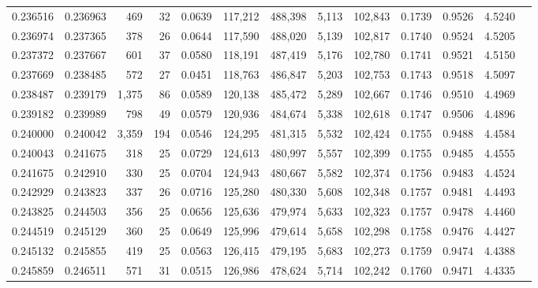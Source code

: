 \begin{tabular}{rrrrrrrrrrrrr}
0.236516 & 0.236963 &   469 &  32 &                                     0.0639 & 117,212 & 488,398 &   5,113 & 102,843 & 0.1739 & 0.9526 & 4.5240 \\
0.236974 & 0.237365 &   378 &  26 &                                     0.0644 & 117,590 & 488,020 &   5,139 & 102,817 & 0.1740 & 0.9524 & 4.5205 \\
0.237372 & 0.237667 &   601 &  37 &                                     0.0580 & 118,191 & 487,419 &   5,176 & 102,780 & 0.1741 & 0.9521 & 4.5150 \\
0.237669 & 0.238485 &   572 &  27 &                                     0.0451 & 118,763 & 486,847 &   5,203 & 102,753 & 0.1743 & 0.9518 & 4.5097 \\
0.238487 & 0.239179 & 1,375 &  86 &                                     0.0589 & 120,138 & 485,472 &   5,289 & 102,667 & 0.1746 & 0.9510 & 4.4969 \\
0.239182 & 0.239989 &   798 &  49 &                                     0.0579 & 120,936 & 484,674 &   5,338 & 102,618 & 0.1747 & 0.9506 & 4.4896 \\
0.240000 & 0.240042 & 3,359 & 194 &                                     0.0546 & 124,295 & 481,315 &   5,532 & 102,424 & 0.1755 & 0.9488 & 4.4584 \\
0.240043 & 0.241675 &   318 &  25 &                                     0.0729 & 124,613 & 480,997 &   5,557 & 102,399 & 0.1755 & 0.9485 & 4.4555 \\
0.241675 & 0.242910 &   330 &  25 &                                     0.0704 & 124,943 & 480,667 &   5,582 & 102,374 & 0.1756 & 0.9483 & 4.4524 \\
0.242929 & 0.243823 &   337 &  26 &                                     0.0716 & 125,280 & 480,330 &   5,608 & 102,348 & 0.1757 & 0.9481 & 4.4493 \\
0.243825 & 0.244503 &   356 &  25 &                                     0.0656 & 125,636 & 479,974 &   5,633 & 102,323 & 0.1757 & 0.9478 & 4.4460 \\
0.244519 & 0.245129 &   360 &  25 &                                     0.0649 & 125,996 & 479,614 &   5,658 & 102,298 & 0.1758 & 0.9476 & 4.4427 \\
0.245132 & 0.245855 &   419 &  25 &                                     0.0563 & 126,415 & 479,195 &   5,683 & 102,273 & 0.1759 & 0.9474 & 4.4388 \\
0.245859 & 0.246511 &   571 &  31 &                                     0.0515 & 126,986 & 478,624 &   5,714 & 102,242 & 0.1760 & 0.9471 & 4.4335 \\

\end{tabular}
